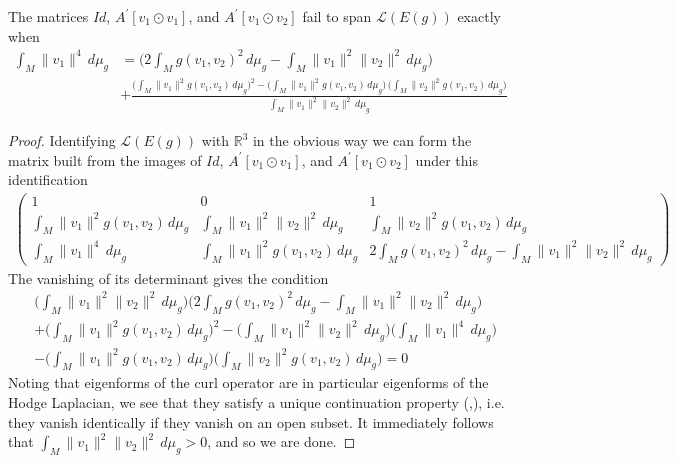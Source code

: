 \begin{lem}
    The matrices $Id$, $A^{\prime}[v_1\odot v_1]$, and $A^{\prime}[v_1\odot v_2]$ fail to span $\mathcal{L}(E(g))$ exactly when 
\small
    \begin{align*}
        \int_M\lVert v_1\rVert^4\,d\mu_g&= \bigg(2\int_M g(v_1,v_2)^2\,d\mu_g-\int_M \lVert v_1\rVert^2 \lVert v_2\rVert ^2\,d\mu_g\bigg)\\
        &+\frac{\bigg(\int_M \lVert v_1 \rVert^2 g(v_1,v_2)\,d\mu_g\bigg)^2-\bigg(\int_M \lVert v_1 \rVert^2 g(v_1,v_2)\,d\mu_g \bigg)\,\bigg(\int_M \lVert v_2 \rVert^2 g(v_1,v_2)\,d\mu_g\bigg)}{\int_M \lVert v_1\rVert^2 \lVert v_2\rVert^2\,d\mu_g}
    \end{align*}
\normalsize
\end{lem}
\begin{proof}
    Identifying $\mathcal{L}(E(g))$ with $\mathbb{R}^3$ in the obvious way we can form the matrix built from the images of $Id$, $A^{\prime}[v_1\odot v_1]$, and $A^{\prime}[v_1\odot v_2]$ under this identification
\begin{align*}
    \begin{pmatrix}
        1&0&1\\
        \int_M \lVert v_1 \rVert^2 g(v_1,v_2)\,d\mu_g&\int_M \lVert v_1 \rVert^2 \lVert v_2\rVert^2\,d\mu_g &\int_M \lVert v_2 \rVert^2 g(v_1,v_2)\,d\mu_g\\
        \int_M \lVert v_1 \rVert^4 \,d\mu_g & \int_M \lVert v_1 \rVert^2 g(v_1,v_2)\,d\mu_g& 2\int_M g(v_1,v_2)^2\,d\mu_g-\int_M \lVert v_1\rVert^2 \lVert v_2\rVert^2\,d\mu_g
    \end{pmatrix}
\end{align*}
The vanishing of its determinant gives the condition
\begin{align*}
    &\bigg(\int_M \lVert v_1 \rVert^2 \lVert v_2\rVert^2\,d\mu_g \bigg)\bigg(2\int_M g(v_1,v_2)^2\,d\mu_g-\int_M \lVert v_1\rVert^2 \lVert v_2\rVert^2\,d\mu_g\bigg)\\
    &+\bigg(\int_M \lVert v_1\rVert^2 g(v_1,v_2)\,d\mu_g\bigg)^2 
    -\bigg(\int_M \lVert v_1\rVert^2 \lVert v_2\rVert^2\,d\mu_g\bigg)\bigg(\int_M \lVert v_1\rVert^4 \,d\mu_g\bigg)\\
    &-\bigg(\int_M \lVert v_1\rVert^2 g(v_1,v_2)\,d\mu_g\bigg)\bigg(\int_M \lVert v_2\rVert^2 g(v_1,v_2)\,d\mu_g\bigg)=0
\end{align*}
Noting that eigenforms of the curl operator are in particular eigenforms of the Hodge Laplacian, we see that they satisfy a unique continuation property (\cite{Aronszajn1957},\cite{Kazdan1988}), i.e. they vanish identically if they vanish on an open subset. It immediately follows that $\int_M \lVert v_1\rVert^2\lVert v_2\rVert^2\,d\mu_g>0$, and so we are done. 
\end{proof}

